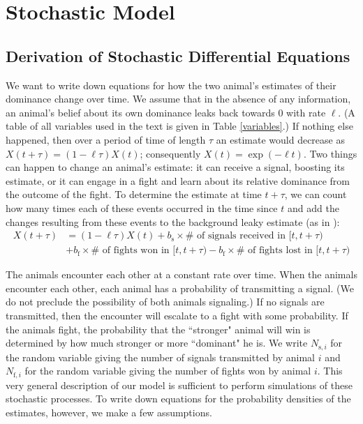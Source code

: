 \documentclass{article}
\begin{document}
\section{Stochastic Model}
\subsection{Derivation of Stochastic Differential Equations}
We want to write down equations for how the two animal's estimates of their dominance change over time.  We assume that in the absence of any information, an animal's belief about its own dominance leaks back towards $0$ with rate $\ell$.  (A table of all variables used in the text is given in Table \ref{variables}.) If nothing else happened, then over a period of time of length $\tau$ an estimate would decrease as $X(t+\tau)=(1-\ell\tau)X(t)$; consequently $X(t)=\exp(-\ell t)$. Two things can happen to change an animal's estimate: it can receive a signal, boosting its estimate, or it can engage in a fight and learn about its relative dominance from the outcome of the fight.  To determine the estimate at time $t+\tau$, we can count how many times each of these events occurred in the time since $t$ and add the changes resulting from these events to the background leaky estimate (as in \cite{Gillespie:2000fk}):
\begin{align*}
X(t+\tau)&=(1-\ell\tau)X(t)+b_{\text{s}}\times\# \text{ of signals received in }[t,t+\tau)
\\&+b_{\text{f}}\times\#\text{ of fights won in }[t,t+\tau)-b_{\text{f}}\times\#\text{ of fights lost in }[t,t+\tau)
\end{align*}


The animals encounter each other at a constant rate over time.  When the animals encounter each other, each animal has a probability of transmitting a signal.  (We do not preclude the possibility of both animals signaling.)  If no signals are transmitted, then the encounter will escalate to a fight with some probability.  If the animals fight, the probability that the ``stronger" animal will win is determined by how much stronger or more ``dominant" he is.  We write $N_{\text{s},i}$ for the random variable giving the number of signals transmitted by animal $i$ and $N_{\text{f},i}$ for the random variable giving the number of fights won by animal $i$.  This very general description of our model is sufficient to perform simulations of these stochastic processes.  To write down equations for the probability densities of the estimates, however, we make a few assumptions.
\end{document}
